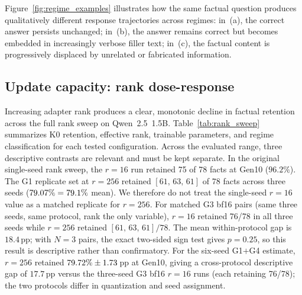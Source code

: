 \documentclass[a4paper,fleqn]{cas-dc}
\newif\ifshowchanges
\newcommand{\rev}[1]{\ifshowchanges{\color{blue}#1}\else{#1}\fi}
\begin{document}
Figure~\ref{fig:regime_examples} illustrates how the same factual question
produces qualitatively different response trajectories across regimes: in~(a),
the correct answer persists unchanged; in~(b), the answer remains correct but
becomes embedded in increasingly verbose filler text; in~(c), the factual
content is progressively displaced by unrelated or fabricated information.

\subsection{Update capacity: rank dose-response}\label{sec:res_capacity}

Increasing adapter rank produces a clear, monotonic decline in factual retention
across the full rank sweep on Qwen~2.5~1.5B.
Table~\ref{tab:rank_sweep} summarizes K0 retention, effective rank, trainable
parameters, and regime classification for each tested configuration. Across the evaluated range, three descriptive contrasts are relevant and must be kept separate.
\rev{In the original single-seed rank sweep, the $r=16$ run retained 75 of 78
facts at Gen10 ($96.2\%$). The G1 replicate set at $r=256$ retained
$[61,\,63,\,61]$ of 78 facts across three seeds ($79.07\% = 79.1\%$
mean). We therefore do not treat the single-seed $r=16$ value as a matched
replicate for $r=256$.}
\rev{For matched G3 bf16 pairs (same three seeds, same protocol, rank the only
variable), $r=16$ retained 76/78 in all three seeds while $r=256$ retained
$[61,\,63,\,61]/78$. The mean within-protocol gap is $18.4$\,pp; with $N{=}3$
pairs, the exact two-sided sign test gives $p{=}0.25$, so this result is
descriptive rather than confirmatory.}
\rev{For the six-seed G1$+$G4 estimate, $r=256$ retained
$79.72\%\pm1.73$\,pp at Gen10, giving a cross-protocol
descriptive gap of $17.7$\,pp versus the three-seed G3 bf16 $r=16$ runs (each retaining 76/78); the two
protocols differ in quantization and seed assignment.}
\end{document}
